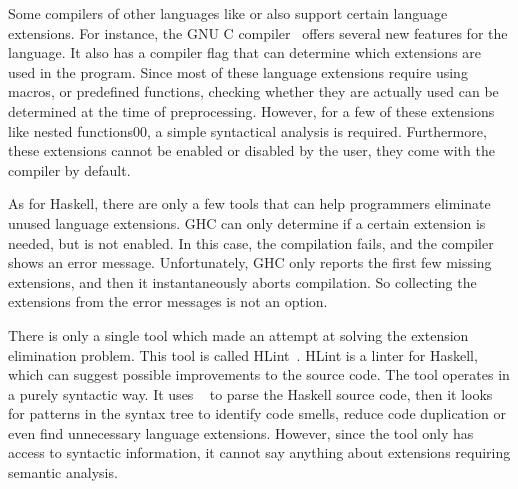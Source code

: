 \documentclass[main.tex]{subfiles}
\begin{document}
		
		Some compilers of other languages like  or  also support certain language extensions. For instance, the GNU C compiler~\cite{gnu-docs} offers several new features for the language. It also has a compiler flag that can determine which extensions are used in the program. Since most of these language extensions require using macros, or predefined functions, checking whether they are actually used can be determined at the time of preprocessing. However, for a few of these extensions like nested functions00, a simple syntactical analysis is required. Furthermore, these extensions cannot be enabled or disabled by the user, they come with the compiler by default.
		
		As for Haskell, there are only a few tools that can help programmers eliminate unused language extensions. GHC can only determine if a certain extension is needed, but is not enabled. In this case, the compilation fails, and the compiler shows an error message. Unfortunately, GHC only reports the first few missing extensions, and then it instantaneously aborts compilation. So collecting the extensions from the error messages is not an option.
		
		There is only a single tool which made an attempt at solving the extension elimination problem. This tool is called HLint~\cite{hlint-bib}. HLint is a linter for Haskell, which can suggest possible improvements to the source code. The tool operates in a purely syntactic way. It uses ~\cite{haskell-src-exts} to parse the Haskell source code, then it looks for patterns in the syntax tree to identify code smells, reduce code duplication or even find unnecessary language extensions. However, since the tool only has access to syntactic information, it cannot say anything about extensions requiring semantic analysis.
	
\end{document}
